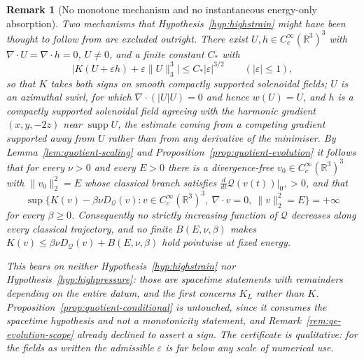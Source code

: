 \documentclass[11pt]{article}
\newtheorem{remark}[theorem]{Remark}
\theoremstyle{definition}
\theoremstyle{plain}
\newcommand{\R}{\mathbb R}
\newcommand{\norm}[1]{\lVert #1\rVert}
\begin{document}
\begin{remark}[No monotone mechanism and no instantaneous energy-only
absorption]\label{rem:no-monotone}
Two mechanisms that Hypothesis~\ref{hyp:highstrain} might have been thought to
follow from are excluded outright.  There exist $U,h\in C_c^\infty(\R^3)^3$ with
$\nabla\cdot U=\nabla\cdot h=0$, $U\neq0$, and a finite constant $C_*$ with
\[
  \bigl|K(U+\varepsilon h)+\varepsilon\norm U_3^3\bigr|\leq C_*|\varepsilon|^{3/2}
  \qquad(|\varepsilon|\leq1),
\]
so that $K$ takes both signs on smooth compactly supported solenoidal fields;
$U$ is an azimuthal swirl, for which $\nabla\cdot(|U|U)=0$ and hence $w(U)=U$,
and $h$ is a compactly supported solenoidal field agreeing with the harmonic
gradient $(x,y,-2z)$ near $\operatorname{supp}U$, the estimate coming from a
competing gradient supported away from $U$ rather than from any derivative of
the minimiser.  By Lemma~\ref{lem:quotient-scaling} and
Proposition~\ref{prop:quotient-evolution} it follows that for every $\nu>0$ and
every $E>0$ there is a divergence-free $v_0\in C_c^\infty(\R^3)^3$ with
$\norm{v_0}_2^2=E$ whose classical branch satisfies
$\frac{d}{dt}\mathcal Q(v(t))|_{0^+}>0$, and that
\[
  \sup\bigl\{K(v)-\beta\nu D_{\mathcal Q}(v):v\in C_c^\infty(\R^3)^3,\
  \nabla\cdot v=0,\ \norm v_2^2=E\bigr\}=+\infty
\]
for every $\beta\geq0$.  Consequently no strictly increasing function of
$\mathcal Q$ decreases along every classical trajectory, and no finite
$B(E,\nu,\beta)$ makes $K(v)\leq\beta\nu D_{\mathcal Q}(v)+B(E,\nu,\beta)$ hold
pointwise at fixed energy.

This bears on neither Hypothesis~\ref{hyp:highstrain} nor
Hypothesis~\ref{hyp:highpressure}: those are spacetime statements with
remainders depending on the entire datum, and the first concerns $K_L$ rather
than $K$.  Proposition~\ref{prop:quotient-conditional} is untouched, since it
consumes the spacetime hypothesis and not a monotonicity statement, and
Remark~\ref{rem:qe-evolution-scope} already declined to assert a sign.  The
certificate is qualitative: for the fields as written the admissible
$\varepsilon$ is far below any scale of numerical use.


\end{remark}
\end{document}
